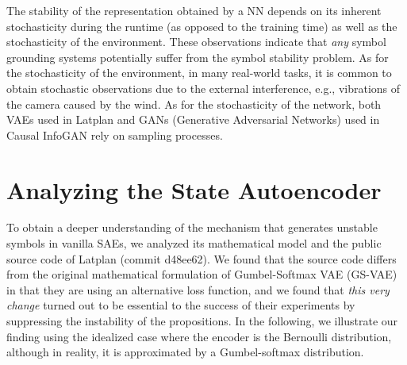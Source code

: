 
The stability of the representation obtained by a NN depends
on
its inherent stochasticity during the runtime (as opposed to the training time) as well as
the stochasticity of the environment.
% 
These observations indicate that \emph{any} symbol grounding systems potentially suffer from 
the symbol stability problem.
% 
As for the stochasticity of the environment,
in many real-world tasks, it is common to obtain stochastic observations
due to the external interference, e.g., vibrations of the camera caused by the wind.
% 
As for the stochasticity of the network,
both
VAEs \cite{kingma2013auto,jang2016categorical,higgins2016beta} used in Latplan
and
GANs (Generative Adversarial Networks) \cite{goodfellow2014generative} used in Causal InfoGAN \cite{kurutach2018learning}
rely on sampling processes.

\section{Analyzing the State Autoencoder}
\label{analysis}

To obtain a deeper understanding of the mechanism that generates
unstable symbols in vanilla SAEs, we
analyzed its mathematical model and the public source code of Latplan (commit d48ee62).
% 
We found that the source code differs from the original mathematical formulation of Gumbel-Softmax VAE (GS-VAE)
in that they are using an alternative loss function,
and we found that \emph{this very change} turned out to be essential to the success of their experiments
by suppressing the instability of the propositions.
In the following, we illustrate our finding using the idealized case where the encoder is the Bernoulli distribution,
although in reality, it is approximated by a Gumbel-softmax distribution.


